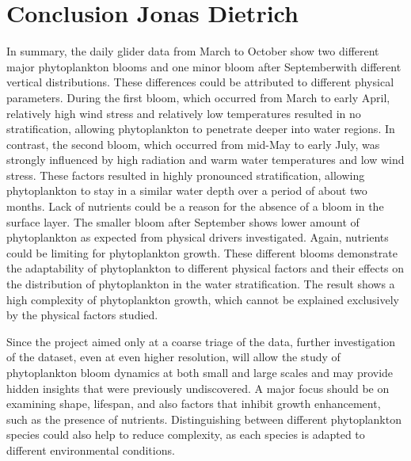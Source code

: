 \documentclass[../Main.tex]{subfiles}
\begin{document}
\section*{\crule[blue]{.3cm}{.3cm} Conclusion \scriptsize{Jonas Dietrich}}
In summary, the daily glider data from March to October show two different major phytoplankton blooms and one minor bloom after Septemberwith different vertical distributions. These differences could be attributed to different physical parameters.
During the first bloom, which occurred from March to early April, relatively high wind stress and relatively low temperatures resulted in no stratification, allowing phytoplankton to penetrate deeper into water regions.
In contrast, the second bloom, which occurred from mid-May to early July, was strongly influenced by high radiation and warm water temperatures and low wind stress.
These factors resulted in highly pronounced stratification, allowing phytoplankton to stay in a similar water depth over a period of about two months.
Lack of nutrients could be a reason for the absence of a bloom in the surface layer.
The smaller bloom after September shows lower amount of phytoplankton as expected from physical drivers investigated.
Again, nutrients could be limiting for phytoplankton growth.
These different blooms demonstrate the adaptability of phytoplankton to different physical factors and their effects on the distribution of phytoplankton in the water stratification.
The result shows a high complexity of phytoplankton growth, which cannot be explained exclusively by the physical factors studied.

Since the project aimed only at a coarse triage of the data, further investigation of the dataset, even at even higher resolution, will allow the study of phytoplankton bloom dynamics at both small and large scales and may provide hidden insights that were previously undiscovered.
A major focus should be on examining shape, lifespan, and also factors that inhibit growth enhancement, such as the presence of nutrients.
Distinguishing between different phytoplankton species could also help to reduce complexity, as each species is adapted to different environmental conditions. 
\end{document}
